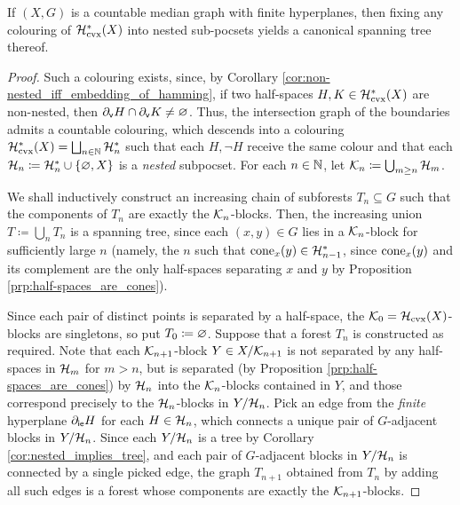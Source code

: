 \documentclass[reqno]{amsart}
\begin{document}
    \begin{proposition}\label{prp:canonical_spanning_trees}
        If $(X,G)$ is a countable median graph with finite hyperplanes, then fixing any colouring of $\mc{H}_\mathrm{cvx}^\ast(X)$ into nested sub-pocsets yields a canonical spanning tree thereof.
    \end{proposition}
    \begin{proof}
        Such a colouring exists, since, by Corollary \ref{cor:non-nested_iff_embedding_of_hamming}, if two half-spaces $H,K\in\mc{H}^\ast_\mathrm{cvx}(X)$ are non-nested, then $\del_\mathsf{v}H\cap\del_\mathsf{v}K\neq\em$. Thus, the intersection graph of the boundaries admits a countable colouring, which descends into a colouring $\mc{H}^\ast_\mathrm{cvx}(X)=\bigsqcup_{n\in\N}\mc{H}^\ast_n$ such that each $H,\lnot H$ receive the same colour and that each $\mc{H}_n\coloneqq\mc{H}_n^\ast\cup\l\{\em,X\r\}$ is a \textit{nested} subpocset. For each $n\in\N$, let $\mc{K}_n\coloneqq\bigcup_{m\geq n}\mc{H}_m$.

        We shall inductively construct an increasing chain of subforests $T_n\subseteq G$ such that the components of $T_n$ are exactly the $\mc{K}_n$-blocks. Then, the increasing union $T\coloneqq\bigcup_nT_n$ is a spanning tree, since each $(x,y)\in G$ lies in a $\mc{K}_n$-block for sufficiently large $n$ (namely, the $n$ such that $\cone_x(y)\in\mc{H}^\ast_{n-1}$, since $\cone_x(y)$ and its complement are the only half-spaces separating $x$ and $y$ by Proposition \ref{prp:half-spaces_are_cones}).

        Since each pair of distinct points is separated by a half-space, the $\mc{K}_0=\mc{H}_\mathrm{cvx}(X)$-blocks are singletons, so put $T_0\coloneqq\em$. Suppose that a forest $T_n$ is constructed as required. Note that each $\mc{K}_{n+1}$-block $Y\in X/\mc{K}_{n+1}$ is not separated by any half-spaces in $\mc{H}_m$ for $m>n$, but is separated (by Proposition \ref{prp:half-spaces_are_cones}) by $\mc{H}_n$ into the $\mc{K}_n$-blocks contained in $Y$, and those correspond precisely to the $\mc{H}_n$-blocks in $Y/\mc{H}_n$. Pick an edge from the \textit{finite} hyperplane $\del_\mathsf{ie}H$ for each $H\in\mc{H}_n$, which connects a unique pair of $G$-adjacent blocks in $Y/\mc{H}_n$. Since each $Y/\mc{H}_n$ is a tree by Corollary \ref{cor:nested_implies_tree}, and each pair of $G$-adjacent blocks in $Y/\mc{H}_n$ is connected by a single picked edge, the graph $T_{n+1}$ obtained from $T_n$ by adding all such edges is a forest whose components are exactly the $\mc{K}_{n+1}$-blocks.
    \end{proof}
\end{document}
